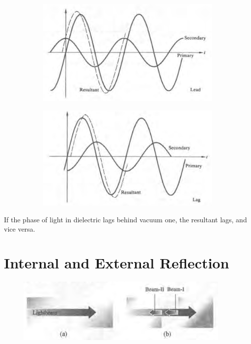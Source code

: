 \begin{figure}[H]
  \centering
  \begin{subfigure}{.45\textwidth}
    \centering
    \includegraphics[width=\linewidth]{figures/Light-speed-in-dielectric1.png}
  \end{subfigure}
  \begin{subfigure}{.45\textwidth}
    \centering
    \includegraphics[width=\linewidth]{figures/Light-speed-in-dielectric2.png}
  \end{subfigure}
\end{figure}

If the phase of light in dielectric lags behind vacuum one, the resultant lags, and vice versa.

\section{Internal and External Reflection}

\begin{figure}[H]
  \centering
  \includegraphics[width=0.8\linewidth]{figures/internal-external-reflection}
\end{figure}

